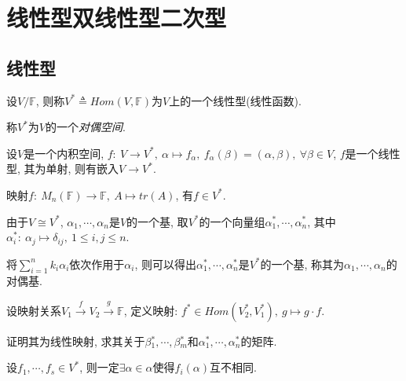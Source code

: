 
\chapter{ 线性型双线性型二次型 }

\section{ 线性型 }

\begin{definition}[线性型]
    设$V/\mathbb{F}$, 则称$V^*\triangleq Hom(V, \mathbb{F})$为$V$上的一个线性型(线性函数). \par
    称$V^*$为$V$的一个\emph{对偶空间}.
\end{definition}

\begin{example}
    设$V$是一个内积空间, $f: \ V \to V^*, \ \alpha \mapsto f_{\alpha}, \ f_{\alpha}(\beta)=(\alpha, \beta), \ \forall \beta \in V$, $f$是一个线性型, 其为单射, 则有嵌入$V\to V^*$.
\end{example}

\begin{example}
    映射$f: \ M_n(\mathbb{F}) \to \mathbb{F}, \ A \mapsto tr(A)$, 有$f\in V^*$.
\end{example}

\begin{definition}[对偶基]
    由于$V \cong V^*$, $\alpha{_1}, \cdots, \alpha{_n}$是$V$的一个基, 取$V^*$的一个向量组$\alpha{_1^*}, \cdots, \alpha{_n^*}$, 其中$\alpha{_i^*}:\ \alpha{_j}\mapsto \delta{_{ij}}, \ 1 \le i,j \le n$.\par
    将$\sum^n_{i=1}k_i\alpha{_i}$依次作用于$\alpha{_i}$, 则可以得出$\alpha{_1^*}, \cdots, \alpha{_n^*}$是$V^*$的一个基, 称其为$\alpha{_1}, \cdots, \alpha{_n}$的对偶基.
\end{definition}

\begin{example}
    设映射关系$V_1\stackrel{f}{\to} V_2\stackrel{g}{\to} \mathbb{F}$, 定义映射: $f^*\in Hom(V_2^*, V_1^*), \ g \mapsto g\cdot f$.\par
    证明其为线性映射, 求其关于$\beta{_1^*}, \cdots, \beta{_m^*}$和$\alpha{_1^*}, \cdots, \alpha{_n^*}$的矩阵.
\end{example}

\begin{statement}
    设$f_1, \cdots, f_s \in V^*$, 则一定$\exists \alpha \in \alpha$使得$f_i(\alpha)$互不相同.
\end{statement}

